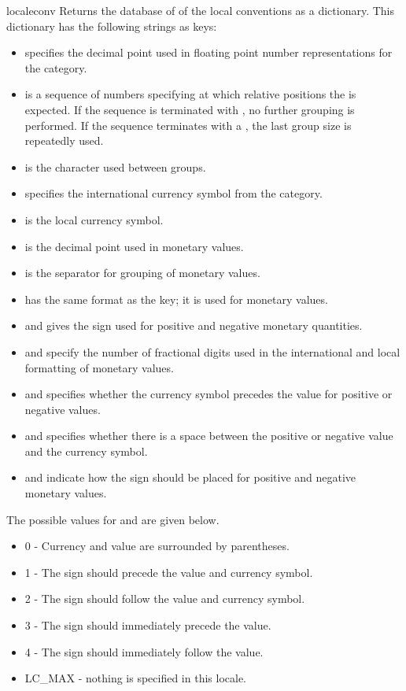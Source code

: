 \begin{funcdesc}{localeconv}{}
Returns the database of of the local conventions as a dictionary. This
dictionary has the following strings as keys:
\begin{itemize}
\item {} specifies the decimal point used in
floating point number representations for the 
category.
\item {} is a sequence of numbers specifying at which
relative positions the  is expected. If the
sequence is terminated with , no further
grouping is performed. If the sequence terminates with a , the last
group size is repeatedly used.
\item {} is the character used between groups.
\item {} specifies the international currency
symbol from the  category.
\item {} is the local currency symbol.
\item {} is the decimal point used in monetary
values.
\item {} is the separator for grouping of
monetary values.
\item {} has the same format as the 
key; it is used for monetary values.
\item {} and  gives the sign
used for positive and negative monetary quantities.
\item {} and  specify the number
of fractional digits used in the international and local formatting
of monetary values.
\item {} and  specifies whether
the currency symbol precedes the value for positive or negative
values.
\item {} and  specifies
whether there is a space between the positive or negative value and
the currency symbol.
\item {} and  indicate how the
sign should be placed for positive and negative monetary values. 
\end{itemize}
The possible values for  and 
are given below.
\begin{itemize}
\item 0 - Currency and value are surrounded by parentheses.
\item 1 - The sign should precede the value and currency symbol.
\item 2 - The sign should follow the value and currency symbol.
\item 3 - The sign should immediately precede the value.
\item 4 - The sign should immediately follow the value.
\item LC_MAX - nothing is specified in this locale.
\end{itemize}
\end{funcdesc}

